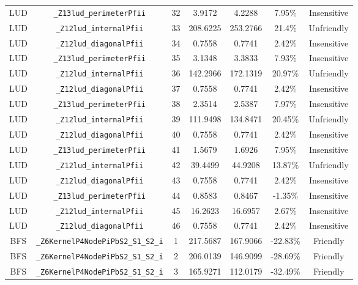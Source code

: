 \documentclass{article}
\begin{document}
\begin{table}[H]
\begin{tabular}{c c c c c c c}
LUD & \verb|_Z13lud_perimeterPfii|                   & 32 & 3.9172    & 4.2288   & 7.95\% &Insensitive\\
LUD & \verb|_Z12lud_internalPfii|                    & 33 & 208.6225  & 253.2766 & 21.4\% &Unfriendly\\
LUD & \verb|_Z12lud_diagonalPfii|                    & 34 & 0.7558    & 0.7741   & 2.42\% &Insensitive\\
LUD & \verb|_Z13lud_perimeterPfii|                   & 35 & 3.1348    & 3.3833   & 7.93\% &Insensitive\\
LUD & \verb|_Z12lud_internalPfii|                    & 36 & 142.2966  & 172.1319 & 20.97\% &Unfriendly\\
LUD & \verb|_Z12lud_diagonalPfii|                    & 37 & 0.7558    & 0.7741   & 2.42\% &Insensitive\\
LUD & \verb|_Z13lud_perimeterPfii|                   & 38 & 2.3514    & 2.5387   & 7.97\% &Insensitive\\
LUD & \verb|_Z12lud_internalPfii|                    & 39 & 111.9498  & 134.8471 & 20.45\% &Unfriendly\\
LUD & \verb|_Z12lud_diagonalPfii|                    & 40 & 0.7558    & 0.7741   & 2.42\% &Insensitive\\
LUD & \verb|_Z13lud_perimeterPfii|                   & 41 & 1.5679    & 1.6926   & 7.95\% &Insensitive\\
LUD & \verb|_Z12lud_internalPfii|                    & 42 & 39.4499   & 44.9208  & 13.87\% &Unfriendly\\
LUD & \verb|_Z12lud_diagonalPfii|                    & 43 & 0.7558    & 0.7741   & 2.42\% &Insensitive\\
LUD & \verb|_Z13lud_perimeterPfii|                   & 44 & 0.8583    & 0.8467   & -1.35\% &Insensitive\\
LUD & \verb|_Z12lud_internalPfii|                    & 45 & 16.2623   & 16.6957  & 2.67\% &Insensitive\\
LUD & \verb|_Z12lud_diagonalPfii|                    & 46 & 0.7558    & 0.7741   & 2.42\% &Insensitive\\
BFS & \verb|_Z6KernelP4NodePiPbS2_S1_S2_i|           & 1  & 217.5687  & 167.9066 & -22.83\% &Friendly\\
BFS & \verb|_Z6KernelP4NodePiPbS2_S1_S2_i|           & 2  & 206.0139  & 146.9099 & -28.69\% &Friendly\\
BFS & \verb|_Z6KernelP4NodePiPbS2_S1_S2_i|           & 3  & 165.9271  & 112.0179 & -32.49\% &Friendly\\

\end{tabular}
\end{table}
\end{document}
